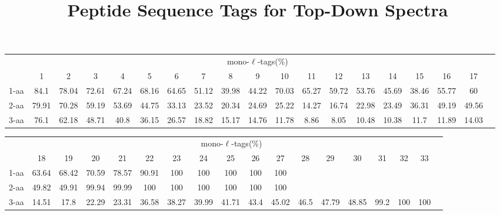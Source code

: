 \documentclass{article}[12pt]
\title{Peptide Sequence Tags for Top-Down Spectra}
\author{}
\begin{document}
\maketitle

\doublespacing
\begin{abstract}


\end{abstract}


\begin{landscape}

\begin{table}[h]\tiny
\vspace{3mm}
{\centering
\begin{center}
\begin{tabular}{|l|c|c|c|c|c|c|c|c|c|c|c|c|c|c|c|c|c|c|}
  \hline
  & \multicolumn{ 17 }{|c|}{mono-$\ell$-tags(\%)} \\
  \cline{2- 18}
    & 1 & 2 & 3 & 4 & 5 & 6 & 7 & 8 & 9 & 10 & 11 & 12 & 13 & 14 & 15 & 16 & 17\\
  \hline
1-aa  & 84.1 & 78.04 & 72.61 & 67.24 & 68.16 & 64.65 & 51.12 & 39.98 & 44.22 & 70.03 & 65.27 & 59.72 & 53.76 & 45.69 & 38.46 & 55.77 & 60\\
2-aa  & 79.91 & 70.28 & 59.19 & 53.69 & 44.75 & 33.13 & 23.52 & 20.34 & 24.69 & 25.22 & 14.27 & 16.74 & 22.98 & 23.49 & 36.31 & 49.19 & 49.56\\
3-aa  & 76.1 & 62.18 & 48.71 & 40.8 & 36.15 & 26.57 & 18.82 & 15.17 & 14.76 & 11.78 & 8.86 & 8.05 & 10.48 & 10.38 & 11.7 & 11.89 & 14.03\\
 \hline
\end{tabular}
\end{center}
\par}
\centering

\vspace{3mm}
\end{table}
\begin{table}[h]\tiny
\vspace{3mm}
{\centering
\begin{center}
\begin{tabular}{|l|c|c|c|c|c|c|c|c|c|c|c|c|c|c|c|c|c|}
  \hline
  & \multicolumn{ 16 }{|c|}{mono-$\ell$-tags(\%)} \\
  \cline{2- 17}
    & 18 & 19 & 20 & 21 & 22 & 23 & 24 & 25 & 26 & 27 & 28 & 29 & 30 & 31 & 32 & 33\\
  \hline
1-aa  & 63.64 & 68.42 & 70.59 & 78.57 & 90.91 & 100 & 100 & 100 & 100 & 100 &  &  &  &  &  & \\
2-aa  & 49.82 & 49.91 & 99.94 & 99.99 & 100 & 100 & 100 & 100 & 100 & 100 &  &  &  &  &  & \\
3-aa  & 14.51 & 17.8 & 22.29 & 23.31 & 36.58 & 38.27 & 39.99 & 41.71 & 43.4 & 45.02 & 46.5 & 47.79 & 48.85 & 99.2 & 100 & 100\\
 \hline
\end{tabular}
\end{center}
\par}
\centering


\end{table}
\end{landscape}
\end{document}
